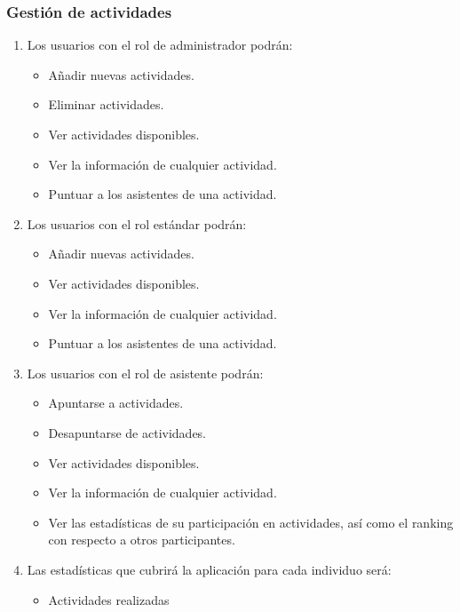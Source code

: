 \subsubsection{Gestión de actividades}

\begin{enumerate}[start=37,label={RF-\arabic*.}]

    \item Los usuarios con el rol de administrador podrán:
        \begin{itemize}
            \item Añadir nuevas actividades.
            \item Eliminar actividades.
            \item Ver actividades disponibles.
            \item Ver la información de cualquier actividad.
            \item Puntuar a los asistentes de una actividad.
        \end{itemize}
    \item Los usuarios con el rol estándar podrán:
        \begin{itemize}
            \item Añadir nuevas actividades.
            \item Ver actividades disponibles.
            \item Ver la información de cualquier actividad.
            \item Puntuar a los asistentes de una actividad.
        \end{itemize}
    \item Los usuarios con el rol de asistente podrán:
        \begin{itemize}
            \item Apuntarse a actividades.
            \item Desapuntarse de actividades.
            \item Ver actividades disponibles.
            \item Ver la información de cualquier actividad.
            \item Ver las estadísticas de su participación en actividades, así como el ranking con respecto a otros participantes.
        \end{itemize}
    \item Las estadísticas que cubrirá la aplicación para cada individuo será:
        \begin{itemize}
            \item Actividades realizadas

\end{itemize}
\end{enumerate}
